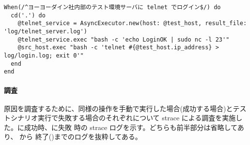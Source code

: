 \begin{lstlisting}[caption=telnetテストステップ,label=lst:telnet-step,linebackgroundcolor={\ifnum\value{lstnumber}>3 \ifnum\value{lstnumber}<6\color{green!30}\fi\fi}]
When(/^ヨーヨーダイン社内部のテスト環境サーバに telnet でログイン$/) do
  cd('.') do
    @telnet_service = AsyncExecutor.new(host: @test_host, result_file: 'log/telnet_server.log')
    @telnet_service.exec "bash -c 'echo LoginOK | sudo nc -l 23'"
    @src_host.exec "bash -c 'telnet #{@test_host.ip_address} > log/login.log; exit 0'"
  end
end
\end{lstlisting}

    \paragraph{調査}

原因を調査するために、同様の操作を手動で実行した場合(成功する場合)とテス
トシナリオ実行で失敗する場合のそれぞれについて strace による調査を実施し
た。に成功時、に失敗
時の strace ログを示す。どちらも前半部分は省略してあり、
から 終了()までのログを抜粋してある。


